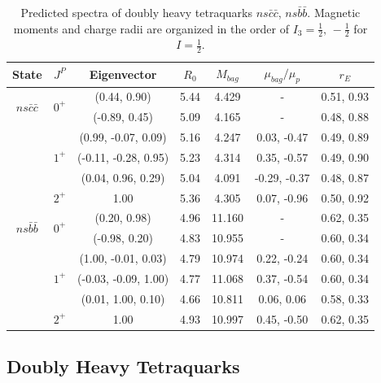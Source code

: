 \documentclass[prd,twocolumn,floatfix,nofootinbib]{revtex4}
\begin{document}
\renewcommand{\tabcolsep}{0.55cm} \renewcommand{\arraystretch}{1.2}
\begin{table}[!htb]
\caption{Predicted spectra of doubly heavy tetraquarks $ns\bar{c}\bar{c}$, $%
ns\bar{b}\bar{b}$. Magnetic moments and charge radii are organized in the
order of $I_{3}=\frac{1}{2},\,-\frac{1}{2}$ for $I=\frac{1}{2}$.}
\label{tab:2heavytetraquark1/2}%
\begin{tabular}{ccccccc}
\hline\hline
\textrm{State} & $J^{P}$ & \textrm{Eigenvector} & $R_{0}$ & $M_{bag}$ & $%
\mu_{bag}/\mu_{p}$ & $r_{E}$ \\ \hline
\multirow{2}{*}{$ns\bar{c}\bar{c}$} & \multirow{2}{*}{$0^{+}$} & (0.44, 0.90)
& 5.44 & 4.429 & - & 0.51, 0.93 \\
&  & (-0.89, 0.45) & 5.09 & 4.165 & - & 0.48, 0.88 \\
& \multirow{3}{*}{$1^{+}$} & (0.99, -0.07, 0.09) & 5.16 & 4.247 & 0.03, -0.47
& 0.49, 0.89 \\
&  & (-0.11, -0.28, 0.95) & 5.23 & 4.314 & 0.35, -0.57 & 0.49, 0.90 \\
&  & (0.04, 0.96, 0.29) & 5.04 & 4.091 & -0.29, -0.37 & 0.48, 0.87 \\
& $2^{+}$ & 1.00 & 5.36 & 4.305 & 0.07, -0.96 & 0.50, 0.92 \\
\multirow{2}{*}{$ns\bar{b}\bar{b}$} & \multirow{2}{*}{$0^{+}$} & (0.20, 0.98)
& 4.96 & 11.160 & - & 0.62, 0.35 \\
&  & (-0.98, 0.20) & 4.83 & 10.955 & - & 0.60, 0.34 \\
& \multirow{3}{*}{$1^{+}$} & (1.00, -0.01, 0.03) & 4.79 & 10.974 & 0.22,
-0.24 & 0.60, 0.34 \\
&  & (-0.03, -0.09, 1.00) & 4.77 & 11.068 & 0.37, -0.54 & 0.60, 0.34 \\
&  & (0.01, 1.00, 0.10) & 4.66 & 10.811 & 0.06, 0.06 & 0.58, 0.33 \\
& $2^{+}$ & 1.00 & 4.93 & 10.997 & 0.45, -0.50 & 0.62, 0.35 \\ \hline\hline
\end{tabular}%
\end{table}

\subsection{Doubly Heavy Tetraquarks}
\end{document}
